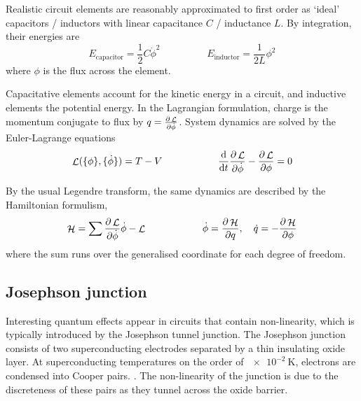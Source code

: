 \documentclass[11pt]{article}
\DeclareMathOperator{\lagr}{\mathcal{L}}
\DeclareMathOperator{\ham}{\mathcal{H}}
\begin{document}
Realistic circuit elements are reasonably approximated to first order as `ideal' capacitors / inductors with linear capacitance $C$ / inductance $L$. By integration, their energies are
\begin{equation}
E_\text{capacitor} = \frac{1}{2} C \dot{\phi}^2
\hspace{2cm}
E_\text{inductor} = \frac{1}{2L} \phi^2
\end{equation}
where $\phi$ is the flux across the element.

Capacitative elements account for the kinetic energy in a circuit, and inductive elements the potential energy. In the Lagrangian formulation, charge is the momentum conjugate to flux by $q = \pdv{\lagr}{\dot{\phi}}$. System dynamics are solved by the Euler-Lagrange equations
\begin{equation}
\lagr(\{\phi\}, \{\dot{\phi}\}) = T - V
\hspace{2cm}
\dv{}{t} \pdv{\lagr}{\dot{\phi}} - \pdv{\lagr}{\phi} = 0
\end{equation}

By the usual Legendre transform, the same dynamics are described by the Hamiltonian formulism,
\begin{equation}
\ham = \sum \pdv{\lagr}{\dot{\phi}} \dot{\phi} - \lagr
\hspace{2cm}
\dot{\phi} = \pdv{\ham}{q}, \quad \dot{q} = - \pdv{\ham}{\phi}
\end{equation}
where the sum runs over the generalised coordinate for each degree of freedom. 




\subsection{Josephson junction}

Interesting quantum effects appear in circuits that contain non-linearity, which is typically introduced by the Josephson tunnel junction. The Josephson junction consists of two superconducting electrodes separated by a thin insulating oxide layer. At superconducting temperatures on the order of $\SI{e-2}{\kelvin}$, electrons are condensed into Cooper pairs. \cite{vool2017introduction}. The non-linearity of the junction is due to the discreteness of these pairs as they tunnel across the oxide barrier.
\end{document}
